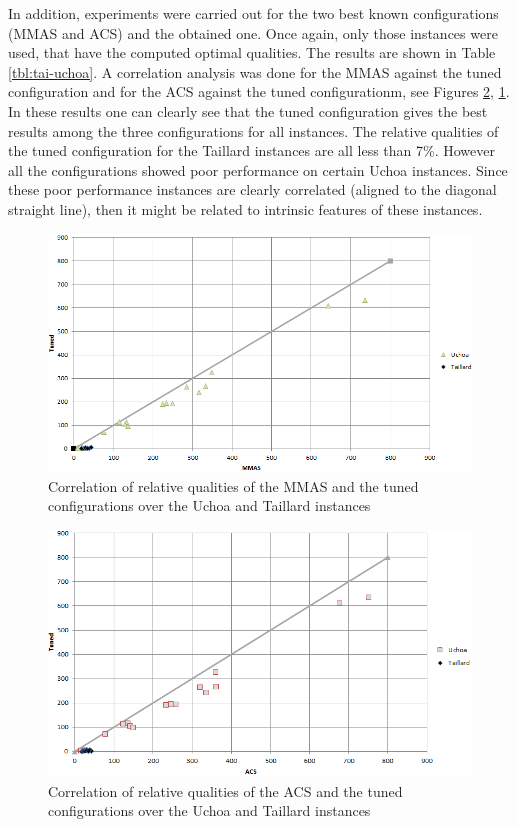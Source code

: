 \documentclass[12pt,a4paper,oneside]{book}
\begin{document}
In addition, experiments were carried out for the two best known configurations (MMAS and ACS) and the obtained one. Once again, only those instances were used, that have the computed optimal qualities. The results are shown in Table \ref{tbl:tai-uchoa}. A correlation analysis was done for the MMAS against the tuned configuration and for the ACS against the tuned configurationm, see Figures \ref{fig:acs-tuned}, \ref{fig:mmas-tuned}. In these results one can clearly see that the tuned configuration gives the best results among the three configurations for all instances. The relative qualities of the tuned configuration for the Taillard instances are all less than 7\%. However all the configurations showed poor performance on certain Uchoa instances. Since these poor performance instances are clearly correlated (aligned to the diagonal straight line), then it might be related to intrinsic features of these instances. 

\begin{figure}[h]
  \centering
    \includegraphics[scale=0.75]{mmas-tuned.PNG}
  \caption{Correlation of relative qualities of the MMAS and the tuned configurations over the Uchoa and Taillard instances}
  \label{fig:mmas-tuned}
\end{figure}

\begin{figure}[h]
  \centering
    \includegraphics[scale=0.75]{acs-tuned.PNG}
  \caption{Correlation of relative qualities of the ACS and the tuned configurations over the Uchoa and Taillard instances}
  \label{fig:acs-tuned}
\end{figure}
\end{document}
